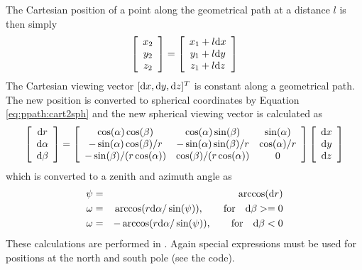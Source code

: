 The Cartesian position of a point along the geometrical path at a
distance $l$ is then simply
\begin{equation}
 \left[ \begin{array}{c}
  x_2 \\
  y_2 \\
  z_2
 \end{array} \right] =
 \left[ \begin{array}{c}
  x_1 + l\mathrm{d} x \\
  y_1 + l\mathrm{d} y \\
  z_1 + l\mathrm{d} z
 \end{array} \right]
  \label{eq:ppath:xdl}
\end{equation}
The Cartesian viewing vector $[\mathrm{d} x, \mathrm{d} y, \mathrm{d} z]^T$ is
constant along a geometrical path. The new position is converted to
spherical coordinates by Equation \ref{eq:ppath:cart2sph} and the new
spherical viewing vector is calculated as
\begin{equation}
 \left[ \begin{array}{c}
  \mathrm{d} r \\
  \mathrm{d} \alpha \\
  \mathrm{d} \beta
 \end{array} \right] =
 \left[ \begin{array}{ccc}
  \cos(\alpha)\cos(\beta) & \cos(\alpha)\sin(\beta) & \sin(\alpha) \\ 
  -\sin(\alpha)\cos(\beta)/r & -\sin(\alpha)\sin(\beta)/r & \cos(\alpha)/r \\ 
  -\sin(\beta)/(r\cos(\alpha)) & \cos(\beta)/(r\cos(\alpha)) & 0 
 \end{array} \right] 
 \left[ \begin{array}{c}
  \mathrm{d} x \\
  \mathrm{d} y \\
  \mathrm{d} z
 \end{array} \right]
 \label{eq:ppath:los2sph}
\end{equation}
which is converted to a zenith and azimuth angle as
\begin{eqnarray}
  \psi &=& \arccos(\mathrm{d} r) \nonumber  \\
  \omega &=& \arccos(r\mathrm{d}\alpha/\sin(\psi)), 
                      \qquad \textrm{for} \quad \mathrm{d}\beta >= 0 \\
  \omega &=& -\arccos(r\mathrm{d}\alpha/\sin(\psi)), 
                      \qquad \textrm{for} \quad \mathrm{d}\beta < 0  \nonumber
 \label{eq:ppath:conv2zaaa}
\end{eqnarray}
These calculations are performed in . Again special
expressions must be used for positions at the north and south pole (see the
code).



